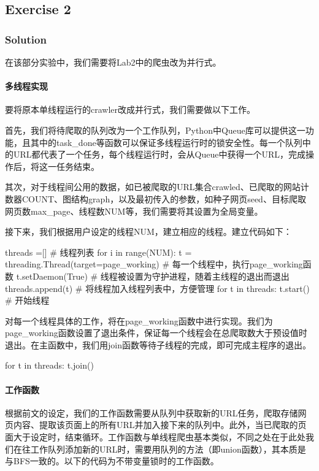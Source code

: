 \documentclass{article}
\begin{document}
\subsection{Exercise 2}

\subsubsection{Solution}

在该部分实验中，我们需要将Lab2中的爬虫改为并行式。

\paragraph{多线程实现}
要将原本单线程运行的crawler改成并行式，我们需要做以下工作。

首先，我们将待爬取的队列改为一个工作队列，Python中Queue库可以提供这一功能，且其中的task\_done等函数可以保证多线程运行时的锁安全性。每一个队列中的URL都代表了一个任务，每个线程运行时，会从Queue中获得一个URL，完成操作后，将这一任务结束。

其次，对于线程间公用的数据，如已被爬取的URL集合crawled、已爬取的网站计数器COUNT、图结构graph，以及最初传入的参数，如种子网页seed、目标爬取网页数max\_page、线程数NUM等，我们需要将其设置为全局变量。

接下来，我们根据用户设定的线程NUM，建立相应的线程。建立代码如下：

\begin{python}
threads =[]                   # 线程列表
for i in range(NUM):
    t = threading.Thread(target=page_working)
                              # 每一个线程中，执行page_working函数
    t.setDaemon(True)         # 线程被设置为守护进程，随着主线程的退出而退出
    threads.append(t)         # 将线程加入线程列表中，方便管理
for t in threads:
    t.start()                 # 开始线程
\end{python}

对每一个线程具体的工作，将在page\_working函数中进行实现。我们为page\_working函数设置了退出条件，保证每一个线程会在总爬取数大于预设值时退出。在主函数中，我们用join函数等待子线程的完成，即可完成主程序的退出。

\begin{python}
for t in threads:
    t.join()
\end{python}

\paragraph{工作函数}
根据前文的设定，我们的工作函数需要从队列中获取新的URL任务，爬取存储网页内容、提取该页面上的所有URL并加入接下来的队列中。此外，当已爬取的页面大于设定时，结束循环。工作函数与单线程爬虫基本类似，不同之处在于此处我们在往工作队列添加新的URL时，需要用队列的方法（即union函数），其本质是与BFS一致的。以下的代码为不带变量锁时的工作函数。
\end{document}
